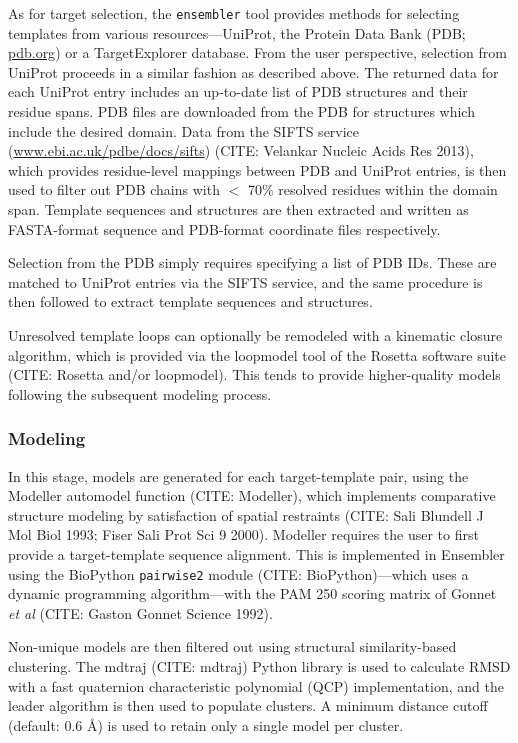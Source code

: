 \documentclass[aps,pre,twocolumn,nofootinbib,superscriptaddress,linenumbers]{revtex4-1}
\begin{document}
As for target selection, the {\tt ensembler} tool provides methods for selecting templates from various resources---UniProt, the Protein Data Bank (PDB; \href{http://www.pdb.org}{pdb.org}) or a TargetExplorer database.
From the user perspective, selection from UniProt proceeds in a similar fashion as described above.
The returned data for each UniProt entry includes an up-to-date list of PDB structures and their residue spans.
PDB files are downloaded from the PDB for structures which include the desired domain.
Data from the SIFTS service (\href{http://www.ebi.ac.uk/pdbe/docs/sifts/}{www.ebi.ac.uk/pdbe/docs/sifts}) (CITE: Velankar Nucleic Acids Res 2013), which provides residue-level mappings between PDB and UniProt entries, is then used to filter out PDB chains with $<$ 70\% resolved residues within the domain span.
Template sequences and structures are then extracted and written as FASTA-format sequence and PDB-format coordinate files respectively.

Selection from the PDB simply requires specifying a list of PDB IDs.
These are matched to UniProt entries via the SIFTS service, and the same procedure is then followed to extract template sequences and structures.

Unresolved template loops can optionally be remodeled with a kinematic closure algorithm, which is provided via the loopmodel tool of the Rosetta software suite (CITE: Rosetta and/or loopmodel).
This tends to provide higher-quality models following the subsequent modeling process.

\subsubsection{Modeling}

In this stage, models are generated for each target-template pair, using the Modeller automodel function (CITE: Modeller), which implements comparative structure modeling by satisfaction of spatial restraints (CITE: Sali Blundell J Mol Biol 1993; Fiser Sali Prot Sci 9 2000).
Modeller requires the user to first provide a target-template sequence alignment.
This is implemented in Ensembler using the BioPython {\tt pairwise2} module (CITE: BioPython)---which uses a dynamic programming algorithm---with the PAM 250 scoring matrix of Gonnet \textit{et al} (CITE: Gaston Gonnet Science 1992).

Non-unique models are then filtered out using structural similarity-based clustering.
The mdtraj (CITE: mdtraj) Python library is used to calculate RMSD with a fast quaternion characteristic polynomial (QCP) implementation, and the leader algorithm is then used to populate clusters.
A minimum distance cutoff (default: 0.6 \AA) is used to retain only a single model per cluster.
\end{document}
